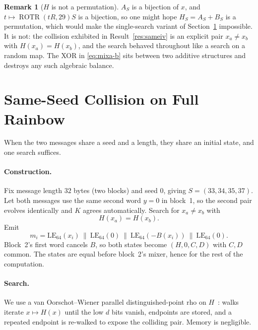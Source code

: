 \documentclass[10pt]{article}
\theoremstyle{definition}
\newtheorem{remark}{Remark}
\newcommand{\ROTR}{\operatorname{ROTR}}
\begin{document}
\begin{remark}[$H$ is not a permutation]
$A_S$ is a bijection of $x$, and $t\mapsto\ROTR(tR,29)S$ is a bijection, so one might hope $H_S = A_S + B_S$ is a permutation, which would make the single-search variant of Section~\ref{sec:sameiv} impossible. It is not: the collision exhibited in Result~\ref{res:sameiv} is an explicit pair $x_a \neq x_b$ with $H(x_a)=H(x_b)$, and the search behaved throughout like a search on a random map. The XOR in \eqref{eq:mixa-b} sits between two additive structures and destroys any such algebraic balance.
\end{remark}

\section{Same-Seed Collision on Full Rainbow}
\label{sec:sameiv}

When the two messages share a seed and a length, they share an initial state, and one search suffices.

\paragraph{Construction.} Fix message length $32$ bytes (two blocks) and seed $0$, giving $S=(33,34,35,37)$. Let both messages use the same second word $y=0$ in block~1, so the second pair evolves identically and $K$ agrees automatically. Search for $x_a \neq x_b$ with
\[
  H(x_a) = H(x_b).
\]
Emit
\[
  m_i = \mathrm{LE}_{64}(x_i)\ \|\ \mathrm{LE}_{64}(0)\ \|\ \mathrm{LE}_{64}(-B(x_i))\ \|\ \mathrm{LE}_{64}(0).
\]
Block~2's first word cancels $B$, so both states become $(H,0,C,D)$ with $C,D$ common. The states are equal before block~2's mixer, hence for the rest of the computation.

\paragraph{Search.} We use a van Oorschot--Wiener parallel distinguished-point rho on $H$~\cite{vow1999}: walks iterate $x \mapsto H(x)$ until the low $d$ bits vanish, endpoints are stored, and a repeated endpoint is re-walked to expose the colliding pair. Memory is negligible.
\end{document}
